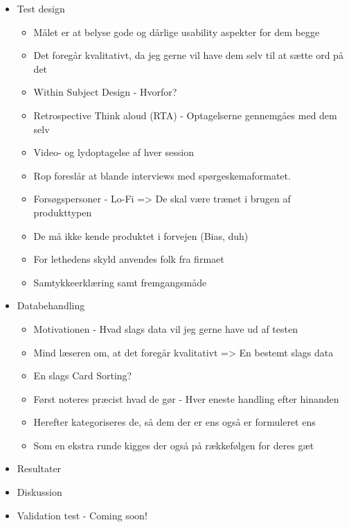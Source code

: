 \begin{itemize}
	
	\item Test design
	\begin{itemize}
		\item Målet er at belyse gode og dårlige usability aspekter for dem begge
		\item Det foregår kvalitativt, da jeg gerne vil have dem selv til at sætte ord på det
		\item Within Subject Design - Hvorfor?
		\item Retrospective Think aloud (RTA) - Optagelserne gennemgåes med dem selv
		\item Video- og lydoptagelse af hver session
		\item Rop foreslår at blande interviews med spørgeskemaformatet.
		\item Forsøgspersoner - Lo-Fi => De skal være trænet i brugen af produkttypen
		\item De må ikke kende produktet i forvejen (Bias, duh)
		\item For lethedens skyld anvendes folk fra firmaet
		\item Samtykkeerklæring samt fremgangsmåde
	\end{itemize}


	\item Databehandling
	\begin{itemize}
		\item Motivationen - Hvad slags data vil jeg gerne have ud af testen
		\item Mind læseren om, at det foregår kvalitativt => En bestemt slags data
		\item En slags Card Sorting?
		\item Først noteres præcist hvad de gør - Hver eneste handling efter hinanden
		\item Herefter kategoriseres de, så dem der er ens også er formuleret ens
		\item Som en ekstra runde kigges der også på rækkefølgen for deres gæt
	\end{itemize}

	\item Resultater
	\item Diskussion
	\item Validation test - Coming soon!
\end{itemize}



















